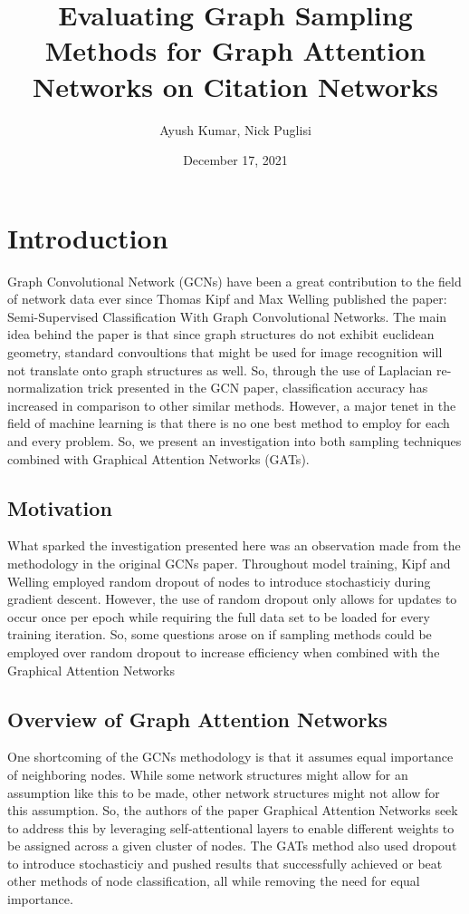 \documentclass{article}
\title{Evaluating Graph Sampling Methods for Graph Attention Networks on Citation Networks}
\author{Ayush Kumar, Nick Puglisi}
\date{December 17, 2021}
\begin{document}
	\maketitle
	\tableofcontents
	\pagebreak
	\section{Introduction}
	
	Graph Convolutional Network (GCNs) have been a great contribution to the field of network data ever since Thomas Kipf and Max Welling published the paper: Semi-Supervised Classification With Graph Convolutional Networks. The main idea behind the paper is that since graph structures do not exhibit euclidean geometry, standard convoultions that might be used for image recognition will not translate onto graph structures as well. So, through the use of Laplacian re-normalization trick presented in the GCN paper, classification accuracy	has increased in comparison to other similar methods. However, a major tenet in the field of machine learning is that there is no one best method to employ for each and every problem. So, we present an investigation into both sampling techniques combined with Graphical Attention Networks (GATs).

	\subsection{Motivation}
	
	What sparked the investigation presented here was an observation made from the methodology in the original GCNs paper. 
	Throughout model training, Kipf and Welling employed random dropout of nodes to introduce stochasticiy during gradient descent. However, the use of random dropout only allows
	for updates to occur once per epoch while requiring the full data set to be loaded for every training iteration. So, some questions arose on if 
	sampling methods could be employed over random dropout to increase efficiency when combined with the Graphical Attention Networks
	
	\subsection{Overview of Graph Attention Networks}
	
	One shortcoming of the GCNs methodology is that it assumes equal importance of neighboring nodes. While some network structures might allow for
	an assumption like this to be made, other network structures might not allow for this assumption. So, the authors of the paper 
	Graphical Attention Networks seek to address this by leveraging self-attentional layers to enable different weights to be assigned across a given cluster of nodes. 
	The GATs method also used dropout to introduce stochasticiy and pushed results that successfully achieved or beat other methods of node classification, all while 
	removing the need for equal importance.
\end{document}
